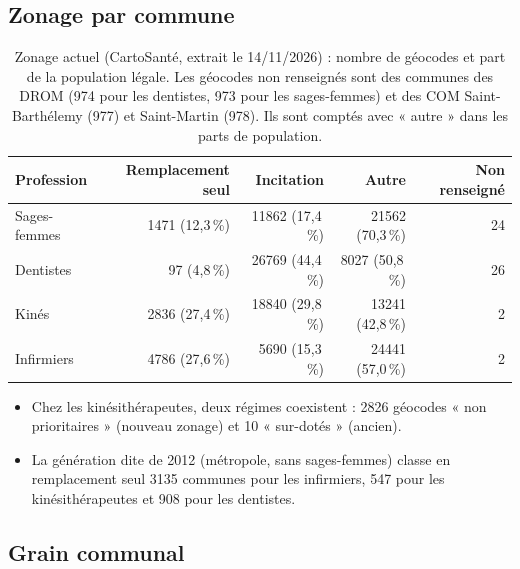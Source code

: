 \subsection{Zonage par commune}\label{a4-sec:res-zonage}
\begin{table}[h]
\centering\small
\begin{tabular}{@{}lrrrr@{}}
\toprule
Profession & Remplacement seul & Incitation & Autre & Non renseigné \\
\midrule
Sages-femmes & \num{1471} \;(12,3\,\%) & \num{11862} \;(17,4\,\%) & \num{21562} \;(70,3\,\%) & 24 \\
Dentistes & 97 \;(4,8\,\%) & \num{26769} \;(44,4\,\%) & \num{8027} \;(50,8\,\%) & 26 \\
Kinés & \num{2836} \;(27,4\,\%) & \num{18840} \;(29,8\,\%) & \num{13241} \;(42,8\,\%) & 2 \\
Infirmiers & \num{4786} \;(27,6\,\%) & \num{5690} \;(15,3\,\%) & \num{24441} \;(57,0\,\%) & 2 \\
\bottomrule
\end{tabular}
\caption{Zonage actuel (CartoSanté, extrait le 14/11/2026) : nombre de géocodes et part de la population
légale\mesure{}. Les géocodes non renseignés sont des communes des DROM (974 pour les dentistes, 973 pour les
sages-femmes) et des COM Saint-Barthélemy (977) et Saint-Martin (978). Ils sont comptés avec « autre » dans les
parts de population.}
\label{a4-tab:zonage}
\end{table}

\begin{itemize}
  \item Chez les kinésithérapeutes, deux régimes coexistent : \num{2826} géocodes « non prioritaires » (nouveau
  zonage) et 10 « sur-dotés » (ancien)\mesure{}.
  \item La génération dite de 2012 (métropole, sans sages-femmes) classe en remplacement seul \num{3135} communes pour
  les infirmiers, 547 pour les kinésithérapeutes et 908 pour les dentistes\mesure{}.
\end{itemize}

\subsection{Grain communal}\label{a4-sec:res-grain}
